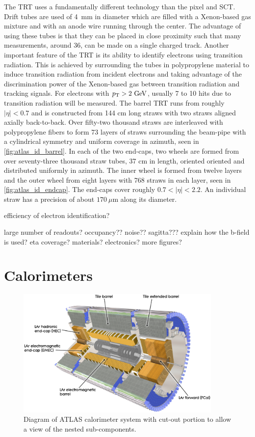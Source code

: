 The TRT uses a fundamentally different technology 
than the pixel and SCT.
Drift tubes are used of 4~mm in diameter 
which are filled with a Xenon-based gas mixture
and with an anode wire running through the center.
The advantage of using these tubes is that they can be placed in close
proximity such that many measurements, around 36,
can be made on a single charged track. Another important feature
of the TRT is its ability to identify electrons using transition radiation.
This is achieved by surrounding the tubes in polypropylene material to induce
transition radiation from incident electrons and taking advantage
of the discrimination power of the Xenon-based gas between 
transition radiation and tracking signals.
For electrons with $\pt>2\GeV$, usually 7 to 10 hits due to transition
radiation will be measured.
The barrel TRT runs from roughly $|\eta|<0.7$ and
is constructed from 144 cm long straws with two straws aligned
axially back-to-back. Over fifty-two thousand straws are interleaved
with polypropylene fibers to form 73 layers of straws surrounding the beam-pipe with
a cylindrical symmetry and uniform coverage in azimuth,
seen in \fig\ref{fig:atlas_id_barrel}.
In each of the two end-caps, two wheels are formed from over seventy-three
thousand straw tubes, 37 cm in length, 
oriented oriented and distributed uniformly in azimuth. 
The inner wheel is formed from twelve layers and the outer wheel from eight
layers with 768 straws in each layer, seen in \fig\ref{fig:atlas_id_endcap}.
The end-caps cover roughly $0.7<|\eta|<2.2$.
An individual straw has a precision of about $170~\mu\textrm{m}$ along
its diameter.




efficiency of electron identification?


large number of readouts?
occupancy??
noise??
sagitta???
explain how the b-field is used?
eta coverage?
materials?
electronics?
more figures?



\section{Calorimeters }
\begin{figure}[ht!]
\centering
\includegraphics[width=0.9\textwidth]{figures/atlas/calorimeter.eps}
\caption{Diagram of ATLAS calorimeter system with cut-out portion
to allow a view of the nested sub-components.}
\label{fig:atlas_calorimeter}
\end{figure}

